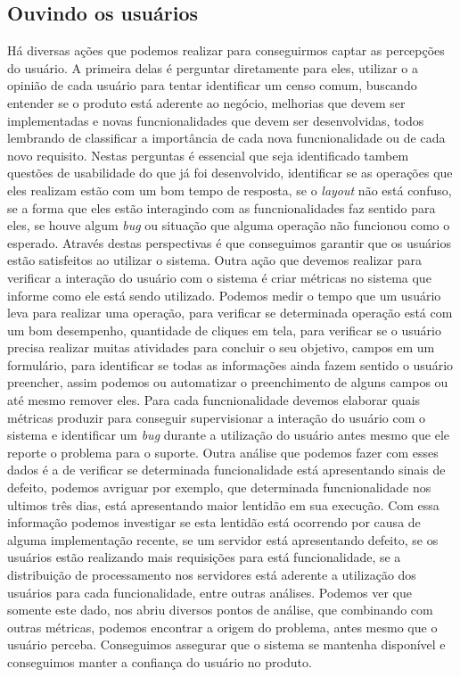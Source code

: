     \subsection{Ouvindo os usuários}
    Há diversas ações que podemos realizar para conseguirmos captar as percepções
    do usuário. A primeira delas é perguntar diretamente para eles, utilizar o
    a opinião de cada usuário para tentar identificar um censo comum, buscando
    entender se o produto está aderente ao negócio, melhorias que devem ser
    implementadas e novas funcnionalidades que devem ser desenvolvidas, todos
    lembrando de classificar a importância de cada nova funcnionalidade ou de
    cada novo requisito. Nestas perguntas é essencial que seja identificado tambem
    questões de usabilidade do que já foi desenvolvido, identificar se as
    operações que eles realizam estão com um bom tempo de resposta, se o
    \textit{layout} não está confuso, se a forma que eles estão interagindo com
    as funcnionalidades faz sentido para eles, se houve algum \textit{bug} ou
    situação que alguma operação não funcionou como o esperado. Através destas
    perspectivas é que conseguimos garantir que os usuários estão satisfeitos
    ao utilizar o sistema. \newline
    Outra ação que devemos realizar para verificar a interação do usuário com o
    sistema é criar métricas no sistema que informe como ele está sendo utilizado.
    Podemos medir o tempo que um usuário leva para realizar uma operação, para
    verificar se determinada operação está com um bom desempenho, quantidade de
    cliques em tela, para verificar se o usuário precisa realizar muitas atividades
    para concluir o seu objetivo, campos em um formulário, para identificar se
    todas as informações ainda fazem sentido o usuário preencher, assim podemos
    ou automatizar o preenchimento de alguns campos ou até mesmo remover eles.
    Para cada funcnionalidade devemos elaborar quais métricas produzir para
    conseguir supervisionar a interação do usuário com o sistema e identificar
    um \textit{bug} durante a utilização do usuário antes mesmo que ele reporte
    o problema para o suporte. Outra análise que podemos fazer com esses dados é
    a de verificar se determinada funcionalidade está apresentando sinais de
    defeito, podemos avriguar por exemplo, que determinada funcnionalidade nos
    ultimos três dias, está apresentando maior lentidão em sua execução. Com
    essa informação podemos investigar se esta lentidão está ocorrendo por causa
    de alguma implementação recente, se um servidor está apresentando defeito,
    se os usuários estão realizando mais requisições para está funcionalidade,
    se a distribuição de processamento nos servidores está aderente a utilização
    dos usuários para cada funcionalidade, entre outras análises. Podemos ver que
    somente este dado, nos abriu diversos pontos de análise, que combinando com
    outras métricas, podemos encontrar a origem do problema, antes mesmo que o
    usuário perceba. Conseguimos assegurar que o sistema se mantenha disponível
    e conseguimos manter a confiança do usuário no produto.

